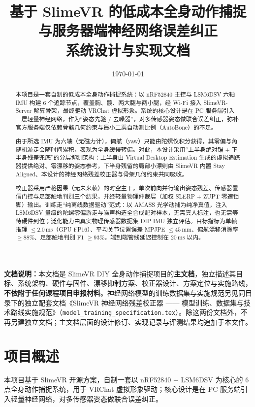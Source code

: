 \documentclass[scheme=plain,UTF8,11pt,a4paper]{ctexart}
\title{\LARGE\bfseries 基于 SlimeVR 的低成本全身动作捕捉\\[0.3em]与服务器端神经网络误差纠正\\[0.6em]\large 系统设计与实现文档}
\date{\today}
\begin{document}
\maketitle

\begin{abstract}
本项目是一套自制的低成本全身动作捕捉系统：以 nRF52840 主控与 LSM6DSV 六轴 IMU 构建 6 个追踪节点，覆盖胸、髋、两大腿与两小腿，经 Wi-Fi 接入 SlimeVR-Server 解算骨架，最终驱动 VRChat 虚拟形象。系统的核心设计是在 PC 服务端引入一层轻量神经网络，作为“姿态先验 / 去噪器”，对多传感器姿态做联合误差纠正，弥补官方服务端仅依赖骨骼几何约束与最小二乘自动测比例（AutoBone）的不足。

由于所选 IMU 为六轴（无磁力计），偏航（yaw）只能由陀螺仪积分获得，其零偏与角随机游走会随时间累积，表现为全身缓慢转偏。对此，本设计采用“上半身绝对锚 + 下半身残差兜底”的分层抑制架构：上半身由 Virtual Desktop Estimation 生成的虚拟追踪器提供绝对、零漂移的姿态参考，下半身残留的局部小漂则由 SlimeVR 内置 Stay Aligned、本设计的神经网络残差校正器与骨架几何约束共同吸收。

校正器采用严格因果（无未来帧）的时空主干，单次前向并行输出姿态残差、传感器置信门控与足部触地判别三个结果，并经轻量物理仲裁层（加权 SLERP + ZUPT 零速锁脚）输出。训练走“纯离线数据驱动”范式：以 AMASS 光学动捕为纯净真值，注入 LSM6DSV 量级的陀螺零偏游走与噪声构造全合成配对样本，无需真人标注，也无需等待硬件到位；泛化能力由真实物理传感器数据集 DIP-IMU 独立评估。目标指标为单帧推理 $\le 2.0$\,ms（GPU FP16）、平均关节位置误差 MPJPE $\le 45$\,mm、偏航漂移消除率 $\ge 88\%$、足部触地判别 F1 $\ge 93\%$。端到端管线延迟控制在 20\,ms 以内。
\end{abstract}

\noindent\textbf{文档说明：}本文档是 SlimeVR DIY 全身动作捕捉项目的\textbf{主文档}，独立描述其目标、系统架构、硬件与固件、漂移抑制方案、校正器设计、方案定位与实施路线，\textbf{不依附于任何课程项目申报材料}。神经网络模型的训练数据集与实施规范另见同目录下的独立配套文档《SlimeVR 神经网络残差校正器 —— 模型训练、数据集与技术路线实施规范》（\texttt{model\_training\_specification.tex}）。除这两份文档外，不再另建独立文档；主文档层面的设计修订、实现记录与评测结果均追加于本文件。

\newpage
\tableofcontents
\newpage

\section{项目概述}
\label{sec:overview}

本项目基于 SlimeVR 开源方案，自制一套以 nRF52840 + LSM6DSV 为核心的 6 点全身动作捕捉系统，用于 VRChat 虚拟形象驱动；核心设计是在 PC 服务端引入轻量神经网络，对多传感器姿态做联合误差纠正。
\end{document}

